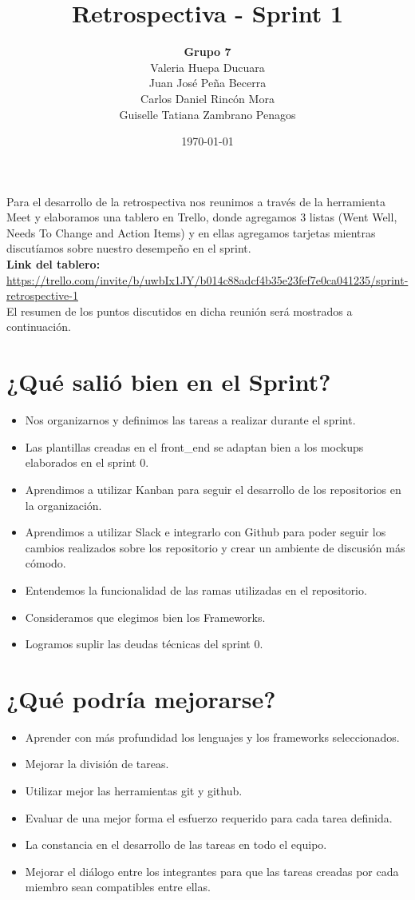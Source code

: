 \documentclass[a4paper,10 pt]{article}
\title{\textbf{Retrospectiva - Sprint 1}}
\author{\textbf{Grupo 7}\\
        \normalsize Valeria Huepa Ducuara\\
        \normalsize Juan José Peña Becerra\\
        \normalsize Carlos Daniel Rincón Mora\\
        \normalsize Guiselle Tatiana Zambrano Penagos}
\date{\today}
\begin{document}
\maketitle

Para el desarrollo de la retrospectiva nos reunimos a través de la herramienta
Meet y elaboramos una tablero en Trello, donde agregamos 3 listas (Went Well,
Needs To Change and Action Items) y en ellas agregamos tarjetas
mientras discutíamos sobre nuestro desempeño en el sprint. \\

\textbf{Link del tablero:} \url{https://trello.com/invite/b/uwbIx1JY/b014c88adcf4b35e23fef7e0ca041235/sprint-retrospective-1}\\

El resumen de los puntos discutidos en dicha reunión será mostrados a
continuación.

\section{¿Qué salió bien en el Sprint?}

\begin{itemize}
    \item Nos organizarnos y definimos las tareas a realizar durante el sprint.
    \item Las plantillas creadas en el front\_end se adaptan bien a los mockups
    elaborados en el sprint 0.
    \item Aprendimos a utilizar Kanban para seguir el desarrollo de los
    repositorios en la organización.
    \item Aprendimos a utilizar Slack e integrarlo con Github para poder seguir
    los cambios realizados sobre los repositorio y crear un ambiente de
    discusión más cómodo.
    \item Entendemos la funcionalidad de las ramas utilizadas en el
    repositorio.
    \item Consideramos que elegimos bien los Frameworks.
    \item Logramos suplir las deudas técnicas del sprint 0.
\end{itemize}{}

\section{¿Qué podría mejorarse?}

\begin{itemize}
    \item Aprender con más profundidad los lenguajes y los frameworks
    seleccionados.
    \item Mejorar la división de tareas.
    \item Utilizar mejor las herramientas git y github.
    \item Evaluar de una mejor forma el esfuerzo requerido para cada tarea
    definida.
    \item La constancia en el desarrollo de las tareas en todo el equipo.
    \item Mejorar el diálogo entre los integrantes para que las tareas creadas
    por cada miembro sean compatibles entre ellas.
\end{itemize}{}
\end{document}
